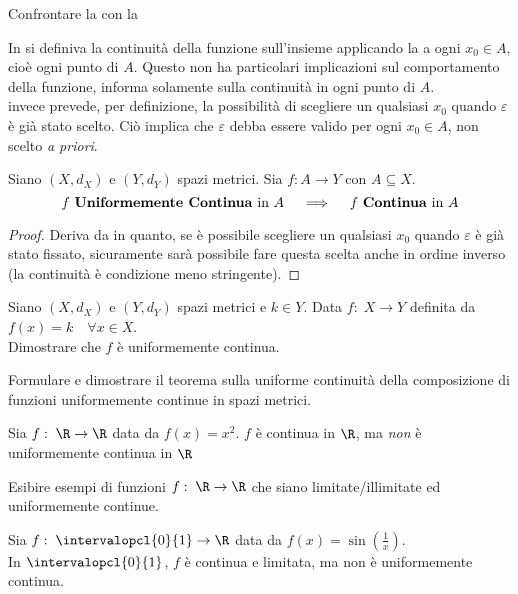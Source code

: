 \begin{exercise}
	\label{ex:cont_unif_cont_comparision}
	Confrontare la  con la 
	\begin{solution}
		In  si definiva la continuità della funzione sull'insieme applicando la  a ogni $x_0 \in A$, cioè ogni punto di $A$. Questo non ha particolari implicazioni sul comportamento della funzione, informa solamente sulla continuità in ogni punto di $A$.\\
		 invece prevede, per definizione, la possibilità di scegliere un qualsiasi $x_0$ quando $\varepsilon$ è già stato scelto. Ciò implica che $\varepsilon$ debba essere valido per ogni $x_0 \in A$, non scelto \textit{a priori}.
	\end{solution}
\end{exercise}
\begin{proposition}
	\label{prop:if_unif_cont_then_conf}
	Siano $(X,d_X)$ e $(Y,d_Y)$ spazi metrici. Sia $f:A \to Y$ con $A \subseteq X$.
	\[f \text{ \textbf{Uniformemente Continua} in } A \quad \implies \quad f \text{ \textbf{Continua} in } A\]
	\begin{proof}
		Deriva da  in quanto, se è possibile scegliere un qualsiasi $x_0$ quando $\varepsilon$ è già stato fissato, sicuramente sarà possibile fare questa scelta anche in ordine inverso (la continuità è condizione meno stringente).
	\end{proof}
\end{proposition}
\begin{exercise}
	Siano $(X,d_X)$ e $(Y,d_Y)$ spazi metrici e $k \in Y$. Data $f:\; X \to Y$ definita da $f(x) = k \quad \forall x \in X$.\\
	Dimostrare che $f$ è uniformemente continua.
\end{exercise}
\begin{exercise}
	Formulare e dimostrare il teorema sulla uniforme continuità della composizione di funzioni uniformemente continue in spazi metrici.
\end{exercise}
\begin{example}
	Sia $f:\; \R \to \R$ data da $f(x) = x^2$. $f$ è continua in $\R$, ma \textit{non} è uniformemente continua in $\R$
\end{example}
\begin{exercise}
	Esibire esempi di funzioni $f:\; \R \to \R$ che siano limitate/illimitate ed uniformemente continue.
\end{exercise}
\begin{example}
	Sia $f:\; \intervalopcl{0}{1} \to \R$ data da $f(x) = \sin(\frac{1}{x})$.\\
	In $\intervalopcl{0}{1}$, $f$ è continua e limitata, ma non è uniformemente continua.
\end{example}

